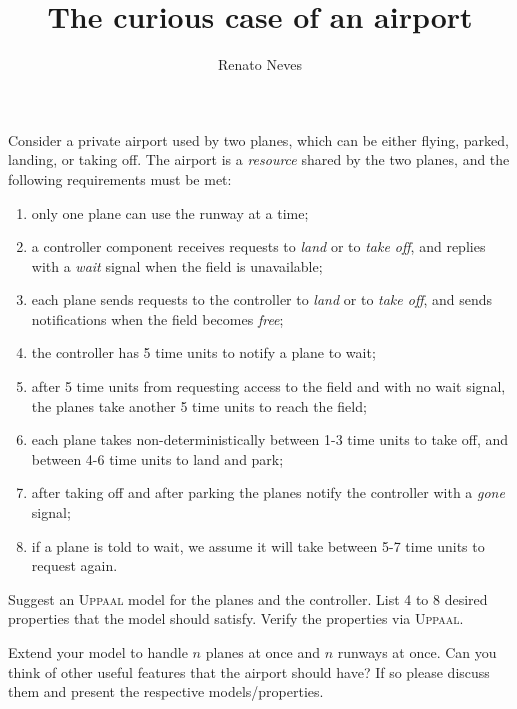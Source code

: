 \documentclass[11pt]{article}
\date{}
\theoremstyle{myplain}
\theoremstyle{definition} %
\begin{document}
 
 
\title{The curious case of an airport}
\author{Renato Neves}
 
\maketitle

Consider a private airport used by two planes, which can be either flying,
parked, landing, or taking off. The airport is a \emph{resource} shared by the
two planes, and the following requirements must be met:
\begin{enumerate}
  \item only one plane can use the runway at a time;
  \item a controller component receives requests to \emph{land} or to \emph{take off}, and replies with a \emph{wait} signal when the field is unavailable;
  \item each plane sends requests to the controller to \emph{land} or to \emph{take off}, and sends notifications when the field becomes \emph{free};
  \item the controller has 5 time units to notify a plane to wait;
  \item after 5 time units from requesting access to the field and with no wait signal, the planes take another 5 time units to reach the field;
  \item each plane takes non-deterministically between 1-3 time units to take off, and between 4-6 time units to land and park;
  \item after taking off and after parking the planes notify the controller with a \emph{gone} signal;
  \item if a plane is told to wait, we assume it will take between 5-7 time units to request again.
\end{enumerate}

\noindent
Suggest an \textsc{Uppaal} model for the planes and the controller. List 4 to 8
desired properties that the model should satisfy. Verify the properties via
\textsc{Uppaal}.

\smallskip
{} Extend your model to handle $n$ planes at
once and $n$ runways at once. Can you think of other useful features that the
airport should have? If so please discuss them and present the respective
models/properties.
\end{document}
